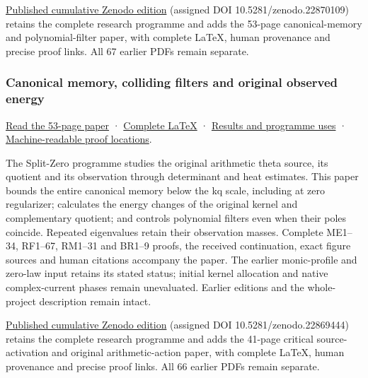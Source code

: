 \documentclass[
]{article}
\begin{document}
\href{https://zenodo.org/records/22870109}{Published cumulative Zenodo
edition} (assigned DOI 10.5281/zenodo.22870109) retains the complete
research programme and adds the 53-page canonical-memory and
polynomial-filter paper, with complete LaTeX, human provenance and
precise proof links. All 67 earlier PDFs remain separate.

\subsubsection{Canonical memory, colliding filters and original observed
energy}\label{canonical-memory-colliding-filters-and-original-observed-energy}

\href{https://github.com/KokunoYumeto/zeta-function-research-reader/blob/main/workbenches/splitzero-tandem/continuations/20260921-canonical-memory-filters/CANONICAL_MEMORY_FILTERS_COMPLETE_READER.pdf}{Read
the 53-page paper} ·
\href{https://github.com/KokunoYumeto/zeta-function-research-reader/blob/main/workbenches/splitzero-tandem/continuations/20260921-canonical-memory-filters/CANONICAL_MEMORY_FILTERS_COMPLETE_READER.tex}{Complete
LaTeX} ·
\href{https://github.com/KokunoYumeto/zeta-function-research-reader/blob/main/workbenches/splitzero-tandem/continuations/20260921-canonical-memory-filters/RESULTS_20260921_016.md}{Results
and programme uses} ·
\href{https://github.com/KokunoYumeto/zeta-function-research-reader/blob/main/workbenches/splitzero-tandem/continuations/20260921-canonical-memory-filters/RESULT_INDEX.json}{Machine-readable
proof locations}.

The Split-Zero programme studies the original arithmetic theta source,
its quotient and its observation through determinant and heat estimates.
This paper bounds the entire canonical memory below the kq scale,
including at zero regularizer; calculates the energy changes of the
original kernel and complementary quotient; and controls polynomial
filters even when their poles coincide. Repeated eigenvalues retain
their observation masses. Complete ME1--34, RF1--67, RM1--31 and BR1--9
proofs, the received continuation, exact figure sources and human
citations accompany the paper. The earlier monic-profile and zero-law
input retains its stated status; initial kernel allocation and native
complex-current phases remain unevaluated. Earlier editions and the
whole-project description remain intact.

\href{https://zenodo.org/records/22869444}{Published cumulative Zenodo
edition} (assigned DOI 10.5281/zenodo.22869444) retains the complete
research programme and adds the 41-page critical source-activation and
original arithmetic-action paper, with complete LaTeX, human provenance
and precise proof links. All 66 earlier PDFs remain separate.
\end{document}
